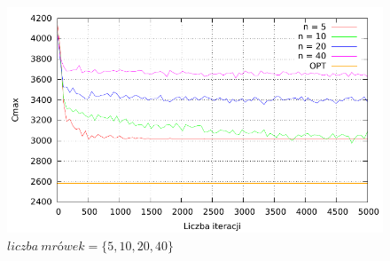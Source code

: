 \documentclass[10pt,a4paper]{article}
\begin{document}
\begin{figure}[h]
    \centering
    \includegraphics{./figures/inst_01_rnd_antno_smooth.pdf}
    \caption{$ liczba\ mrówek = \{ 5, 10, 20, 40 \} $}
\end{figure}
\end{document}
